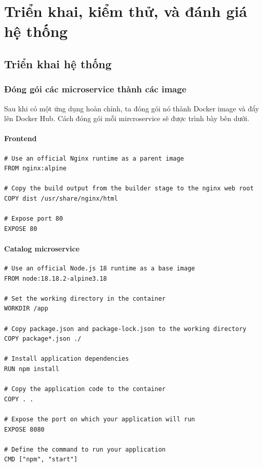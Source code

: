 \chapter{Triển khai, kiểm thử, và đánh giá hệ thống}
\section{Triển khai hệ thống}

\subsection{Đóng gói các microservice thành các image}
\noindent Sau khi có một ứng dụng hoàn chỉnh, ta đóng gói nó thành Docker image và đẩy lên Docker Hub. Cách đóng gói mỗi mircroservice sẽ được trình bày bên dưới.

\subsubsection*{Frontend}

\begin{lstlisting}[language=docker]
# Use an official Nginx runtime as a parent image
FROM nginx:alpine
  
# Copy the build output from the builder stage to the nginx web root
COPY dist /usr/share/nginx/html
  
# Expose port 80
EXPOSE 80
\end{lstlisting}

\subsubsection*{Catalog microservice}

\begin{lstlisting}[language=docker]
# Use an official Node.js 18 runtime as a base image
FROM node:18.18.2-alpine3.18

# Set the working directory in the container
WORKDIR /app

# Copy package.json and package-lock.json to the working directory
COPY package*.json ./

# Install application dependencies
RUN npm install

# Copy the application code to the container
COPY . .

# Expose the port on which your application will run
EXPOSE 8080

# Define the command to run your application
CMD ["npm", "start"]
\end{lstlisting}

